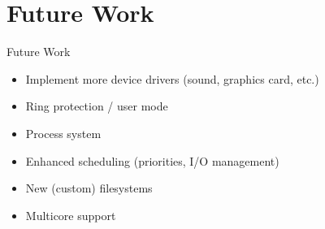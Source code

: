 \section{Future Work}

\begin{frame}{Future Work}
\begin{itemize}
	\item Implement more device drivers (sound, graphics card, etc.)
	\item Ring protection / user mode
	\item Process system
	\item Enhanced scheduling (priorities, I/O management)
	\item New (custom) filesystems
	\item Multicore support
\end{itemize}	
\end{frame}